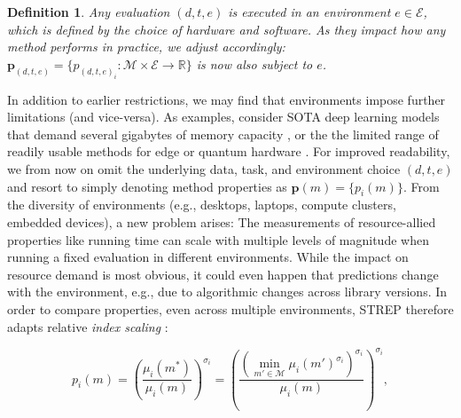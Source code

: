 \documentclass[sn-mathphys,Numbered]{sn-jnl}%
\theoremstyle{thmstylethree}%
\newtheorem{definition}{Definition}%
\begin{document}
\begin{definition}\label{environment}
Any evaluation $(d, t, e)$ is executed in an \emph{environment} $e \in \mathcal{E}$, which is defined by the choice of hardware and software. As they impact how any method performs in practice, we adjust  accordingly: $\bm{p}_{(d, t, e)} = \{p_{(d, t, e)_i}: \mathcal{M} \times \mathcal{E} \rightarrow \mathbb{R} \}$ is now also subject to $e$.
\end{definition}

In addition to earlier restrictions, we may find that environments impose further limitations (and vice-versa).
As examples, consider SOTA deep learning models that demand several gigabytes of memory capacity \cite{strubell_energy_2020}, or the the limited range of readily usable methods for edge \cite{buschjager2020site} or quantum hardware \cite{mucke2023feature}.
For improved readability, we from now on omit the underlying data, task, and environment choice $(d, t, e)$ and resort to simply denoting method properties as $\bm{p}(m) = \{p_i(m)\}$.
From the diversity of environments (e.g., desktops, laptops, compute clusters, embedded devices), a new problem arises:
The measurements of resource-allied properties like running time can scale with multiple levels of magnitude when running a fixed evaluation in different environments.
While the impact on resource demand is most obvious, it could even happen that predictions change with the environment, e.g., due to algorithmic changes across library versions.
In order to compare properties, even across multiple environments, STREP therefore adapts relative \emph{index scaling} \cite{Assessing_Energy_Efficiency_of_ML}:

\begin{equation}\label{eq:index}
    p_i(m)=\left(\frac{\mu_i(m^*)}{\mu_i(m)}\right)^{\sigma_i}=\left(\frac{ (\min_{m'\in \mathcal{M}} \mu_i(m')^{\sigma_i})^{\sigma_i}}{\mu_i(m)}\right)^{\sigma_i},
\end{equation}
\end{document}
